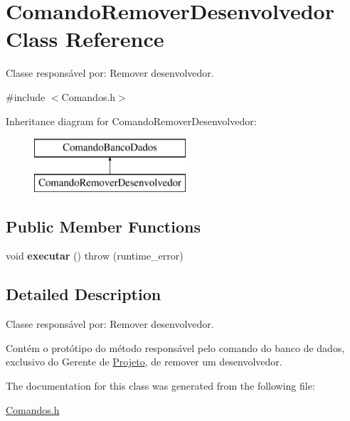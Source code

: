 \hypertarget{class_comando_remover_desenvolvedor}{}\section{Comando\+Remover\+Desenvolvedor Class Reference}
\label{class_comando_remover_desenvolvedor}


Classe responsável por\+: Remover desenvolvedor.  




{\ttfamily \#include $<$Comandos.\+h$>$}

Inheritance diagram for Comando\+Remover\+Desenvolvedor\+:\begin{figure}[H]
\begin{center}
\leavevmode
\includegraphics[height=2.000000cm]{class_comando_remover_desenvolvedor}
\end{center}
\end{figure}
\subsection*{Public Member Functions}
\begin{DoxyCompactItemize}
\item 
\hypertarget{class_comando_remover_desenvolvedor_a771c11514f5a1f892c007e8c34a049dc}{}\label{class_comando_remover_desenvolvedor_a771c11514f5a1f892c007e8c34a049dc} 
void {\bfseries executar} ()  throw (runtime\+\_\+error)
\end{DoxyCompactItemize}


\subsection{Detailed Description}
Classe responsável por\+: Remover desenvolvedor. 

Contém o protótipo do método responsável pelo comando do banco de dados, exclusivo do Gerente de \hyperlink{class_projeto}{Projeto}, de remover um desenvolvedor. 

The documentation for this class was generated from the following file\+:\begin{DoxyCompactItemize}
\item 
\hyperlink{_comandos_8h}{Comandos.\+h}\end{DoxyCompactItemize}
